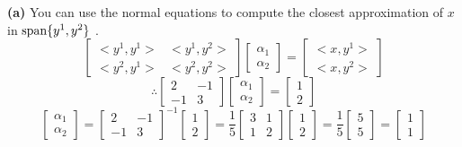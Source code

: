 \documentclass[letterpaper]{article}
\begin{document}
\textbf{(a)}
You can use the normal equations to compute the closest approximation of $x$ in $\textrm{span} \{ y^1, y^2 \}$ . \\
$$\begin{bmatrix}	<y^1, y^1> & <y^1, y^2> \\ <y^2, y^1> & <y^2, y^2>\end{bmatrix}
\begin{bmatrix}	\alpha_1 \\ \alpha_2 \end{bmatrix} =
\begin{bmatrix}	<x, y^1> \\ <x, y^2>\end{bmatrix}$$
$$\therefore \begin{bmatrix} 2 & -1 \\ -1 & 3\end{bmatrix} \begin{bmatrix}	\alpha_1 \\ \alpha_2 \end{bmatrix} = \begin{bmatrix}	1 \\ 2\end{bmatrix}$$
$$\begin{bmatrix}	\alpha_1 \\ \alpha_2 \end{bmatrix} = \begin{bmatrix} 2 & -1 \\ -1 & 3\end{bmatrix}^{-1} \begin{bmatrix}	1 \\ 2\end{bmatrix} = \frac{1}{5}\begin{bmatrix} 3 & 1 \\ 1 & 2\end{bmatrix} \begin{bmatrix}	1 \\ 2\end{bmatrix}= \frac{1}{5} \begin{bmatrix}	5 \\ 5\end{bmatrix} = \begin{bmatrix}	1 \\ 1	\end{bmatrix}$$

\\ \\
\end{document}
